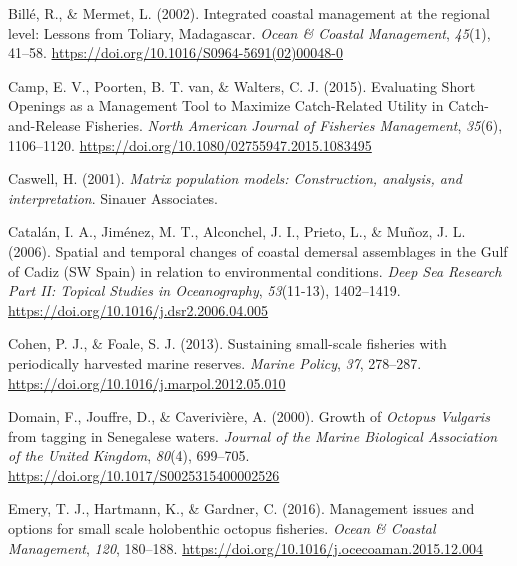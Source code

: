 \documentclass[
]{article}
\newlength{\cslhangindent}
\newlength{\cslentryspacingunit} %
\newenvironment{CSLReferences}[2] %
 {%
  \setlength{\parindent}{0pt}
  \ifodd #1
  \let\oldpar\par
  \def\par{\hangindent=\cslhangindent\oldpar}
  \fi
  \setlength{\parskip}{#2\cslentryspacingunit}
 }%
 {}
\begin{document}
\begin{CSLReferences}{1}{2}
\leavevmode{}%
Billé, R., \& Mermet, L. (2002). Integrated coastal management at the regional level: Lessons from {Toliary}, {Madagascar}. \emph{Ocean \& Coastal Management}, \emph{45}(1), 41--58. \url{https://doi.org/10.1016/S0964-5691(02)00048-0}

\leavevmode{}%
Camp, E. V., Poorten, B. T. van, \& Walters, C. J. (2015). Evaluating {Short Openings} as a {Management Tool} to {Maximize Catch-Related Utility} in {Catch-and-Release Fisheries}. \emph{North American Journal of Fisheries Management}, \emph{35}(6), 1106--1120. \url{https://doi.org/10.1080/02755947.2015.1083495}

\leavevmode{}%
Caswell, H. (2001). \emph{Matrix population models: {Construction}, analysis, and interpretation}. Sinauer Associates.

\leavevmode{}%
Catalán, I. A., Jiménez, M. T., Alconchel, J. I., Prieto, L., \& Muñoz, J. L. (2006). Spatial and temporal changes of coastal demersal assemblages in the {Gulf} of {Cadiz} ({SW Spain}) in relation to environmental conditions. \emph{Deep Sea Research Part II: Topical Studies in Oceanography}, \emph{53}(11-13), 1402--1419. \url{https://doi.org/10.1016/j.dsr2.2006.04.005}

\leavevmode{}%
Cohen, P. J., \& Foale, S. J. (2013). Sustaining small-scale fisheries with periodically harvested marine reserves. \emph{Marine Policy}, \emph{37}, 278--287. \url{https://doi.org/10.1016/j.marpol.2012.05.010}

\leavevmode{}%
Domain, F., Jouffre, D., \& Caverivière, A. (2000). Growth of {\emph{Octopus}}{ \emph{Vulgaris}} from tagging in {Senegalese} waters. \emph{Journal of the Marine Biological Association of the United Kingdom}, \emph{80}(4), 699--705. \url{https://doi.org/10.1017/S0025315400002526}

\leavevmode{}%
Emery, T. J., Hartmann, K., \& Gardner, C. (2016). Management issues and options for small scale holobenthic octopus fisheries. \emph{Ocean \& Coastal Management}, \emph{120}, 180--188. \url{https://doi.org/10.1016/j.ocecoaman.2015.12.004}


\end{CSLReferences}
\end{document}
